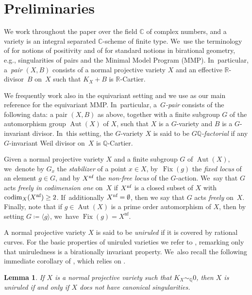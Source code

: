\documentclass[JEP,XML,SOM,Unicode,published]{cedram}
\theoremstyle{plain}
\newtheorem{lem}[thm]{Lemma}
\theoremstyle{definition}
\newcommand{\Q}{\mathbb{Q}}
\newcommand{\R}{\mathbb{R}}
\newcommand{\C}{\mathbb{C}}
\DeclareMathOperator{\codim}{codim}
\DeclareMathOperator{\Aut}{Aut}
\DeclareMathOperator{\Fix}{Fix}
\begin{document}
\section{Preliminaries}
\label{section:preliminaries}

We work throughout the paper over the field $\C$ of complex numbers, and a variety is an integral separated $\C$-scheme of finite type. We~use the terminology of \cite{Laz04book_I} for notions of positivity and of \cite{KM98,Fuj17book} for standard notions in birational geometry, e.g., singularities of pairs and the Minimal Model Program (MMP). In~particular, a~\emph{pair} $(X,B)$ consists of a normal projective variety $X$ and an effective $\R$\nobreakdash-divisor~$B$ on~$X$ such that $K_X+B$ is $\R$-Cartier.

We frequently work also in the equivariant setting and we use \cite{Pro21} as our main reference for the equivariant MMP. In~particular, a~\emph{$G$\nobreakdash-pair} consists of the following data: a pair $(X,B)$ as above, together with a finite subgroup $G$ of the automorphism group $\Aut(X)$ of $X$, such that $X$ is a $G$\nobreakdash-variety and $B$ is a $G$\nobreakdash-invariant divisor. In~this setting, the $G$\nobreakdash-variety $X$ is said to be \emph{$G\Q$-factorial} if any $G$\nobreakdash-invariant Weil divisor on~$X$ is $\Q$\nobreakdash-Cartier.

Given a normal projective variety $X$ and a finite subgroup $G$ of $\Aut(X)$, we~denote by $G_x$ the \emph{stabilizer} of a point $x\in X$, by~$\Fix(g)$ the \emph{fixed locus} of an element $g\in G$, and by $X^\textup{nf}$ the \emph{non-free locus} of the $G$\nobreakdash-action. We~say that $G$ acts \emph{freely in codimension one} on~$X$ if $X^\textup{nf}$ is a closed subset of $X$ with $\codim_X (X^\textup{nf}) \geq 2$. If~additionally $X^\textup{nf} = \emptyset$, then we say that $G$ acts \emph{freely} on~$X$.
Finally, note that if $g \in \Aut(X)$ is a prime order automorphism of $X$, then by setting $G \coloneqq \langle g \rangle$, we~have $ \Fix(g) = X^\mathrm{nf} $.

A normal projective variety $X$ is said to be \emph{uniruled} if it is covered by rational curves. For the basic properties of uniruled varieties we refer to \cite{Debarre01book}, remarking only that uniruledness is a birationally invariant property. We~also recall the following immediate corollary of \cite[Lem.\,3.18]{LMPTX23}, which relies on \cite[Cor.\,0.3]{BDPP13}.

\begin{lem}
\label{lem:uniruled_K-trivial}
If $X$ is a normal projective variety such that $K_X \sim_\Q 0$, then $X$ is uniruled if and only if $X$ does not have canonical singularities.
\end{lem}
\end{document}
